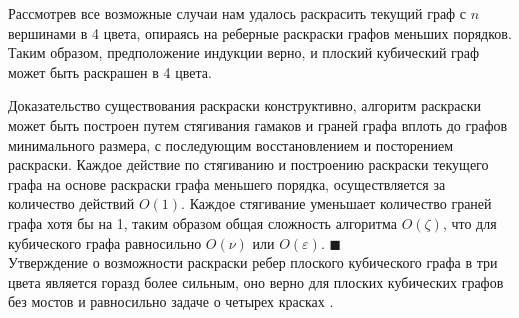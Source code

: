 Рассмотрев все возможные случаи нам удалось раскрасить текущий граф с $n$ вершинами в 4 цвета, опираясь на реберные раскраски графов меньших порядков.
Таким образом, предположение индукции верно, и плоский кубический граф может быть раскрашен в 4 цвета.

Доказательство существования раскраски конструктивно, алгоритм раскраски может быть построен путем стягивания гамаков и граней графа вплоть до графов минимального размера, с последующим восстановлением и посторением раскраски.
Каждое действие по стягиванию и построению раскраски текущего графа на основе раскраски графа меньшего порядка, осуществляется за количество действий $O(1)$.
Каждое стягивание уменьшает количество граней графа хотя бы на 1, таким образом общая сложность алгоритма $O(\zeta)$, что для кубического графа равносильно $O(\nu)$ или $O(\varepsilon)$.
$\blacksquare$\\


Утверждение о возможности раскраски ребер плоского кубического графа в три цвета является горазд более сильным, оно верно для плоских кубических графов без мостов и равносильно задаче о четырех красках \cite{Soifer2009,Tait1880}.





